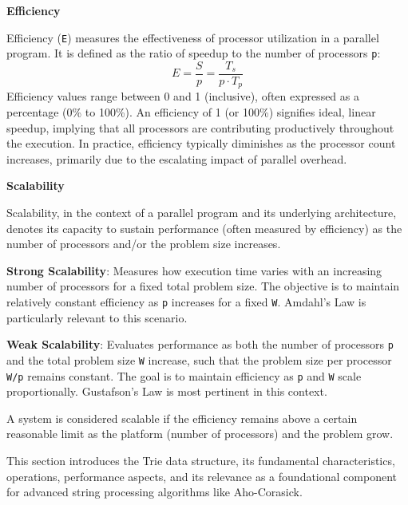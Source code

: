 \textbf{Efficiency}

Efficiency (\texttt{E}) measures the effectiveness of processor utilization in a parallel program. It is defined as the ratio of speedup to the number of processors \texttt{p}:
\[ E = \frac{S}{p} = \frac{T_s}{p \cdot T_p} \]
Efficiency values range between 0 and 1 (inclusive), often expressed as a percentage (0\% to 100\%). An efficiency of 1 (or 100\%) signifies ideal, linear speedup, implying that all processors are contributing productively throughout the execution. In practice, efficiency typically diminishes as the processor count increases, primarily due to the escalating impact of parallel overhead.

\textbf{Scalability}

Scalability, in the context of a parallel program and its underlying architecture, denotes its capacity to sustain performance (often measured by efficiency) as the number of processors and/or the problem size increases.

\textbf{Strong Scalability}: Measures how execution time varies with an increasing number of processors for a fixed total problem size. The objective is to maintain relatively constant efficiency as \texttt{p} increases for a fixed \texttt{W}. Amdahl's Law is particularly relevant to this scenario.

\textbf{Weak Scalability}: Evaluates performance as both the number of processors \texttt{p} and the total problem size \texttt{W} increase, such that the problem size per processor \texttt{W/p} remains constant. The goal is to maintain efficiency as \texttt{p} and \texttt{W} scale proportionally. Gustafson's Law is most pertinent in this context.

A system is considered scalable if the efficiency remains above a certain reasonable limit as the platform (number of processors) and the problem grow.





This section introduces the Trie data structure, its fundamental characteristics, operations, performance aspects, and its relevance as a foundational component for advanced string processing algorithms like Aho-Corasick.

